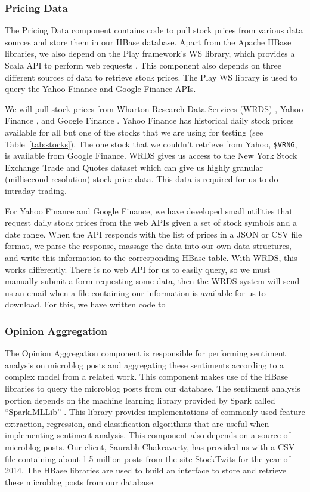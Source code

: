 \subsubsection{Pricing Data}

The Pricing Data component contains code to pull stock prices from various data sources and store them in our HBase database. Apart from the Apache HBase libraries, we also depend on the Play framework's \cite{playframework} WS library, which provides a Scala API to perform web requests \cite{playws}. This component also depends on three different sources of data to retrieve stock prices. The Play WS library is used to query the Yahoo Finance and Google Finance APIs.

We will pull stock prices from Wharton Research Data Services (WRDS) \cite{wrds}, Yahoo Finance \cite{yahoofinance}, and Google Finance \cite{googlefinance}. Yahoo Finance has historical daily stock prices available for all but one of the stocks that we are using for testing (see Table~\ref{tab:stocks}). The one stock that we couldn't retrieve from Yahoo, \texttt{\$VRNG}, is available from Google Finance. WRDS gives us access to the New York Stock Exchange Trade and Quotes dataset which can give us highly granular (millisecond resolution) stock price data. This data is required for us to do intraday trading.

For Yahoo Finance and Google Finance, we have developed small utilities that request daily stock prices from the web APIs given a set of stock symbols and a date range. When the API responds with the list of prices in a JSON \cite{json} or CSV \cite{csv} file format, we parse the response, massage the data into our own data structures, and write this information to the corresponding HBase table. With WRDS, this works differently. There is no web API for us to easily query, so we must manually submit a form requesting some data, then the WRDS system will send us an email when a file containing our information is available for us to download. For this, we have written code to 

\subsubsection{Opinion Aggregation}

The Opinion Aggregation component is responsible for performing sentiment analysis on microblog posts and aggregating these sentiments according to a complex model from a related work. This component makes use of the HBase libraries to query the microblog posts from our database. The sentiment analysis portion depends on the machine learning library provided by Spark called ``Spark.MLLib'' \cite{sparkml}. This library provides implementations of commonly used feature extraction, regression, and classification algorithms that are useful when implementing sentiment analysis. This component also depends on a source of microblog posts. Our client, Saurabh Chakravarty, has provided us with a CSV file containing about 1.5 million posts from the site StockTwits \cite{stocktwits} for the year of 2014. The HBase libraries are used to build an interface to store and retrieve these microblog posts from our database.

